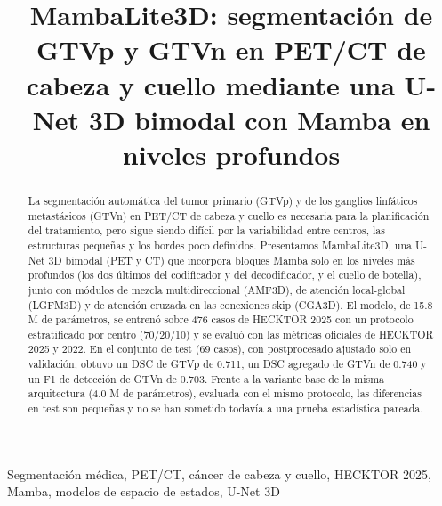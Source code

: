\documentclass[conference]{IEEEtran}
\begin{document}
\title{MambaLite3D: segmentación de GTVp y GTVn en PET/CT de cabeza y cuello mediante una U-Net 3D bimodal con Mamba en niveles profundos}

\author{
    \and

}

\maketitle
\begin{abstract}
La segmentación automática del tumor primario (GTVp) y de los ganglios linfáticos metastásicos (GTVn) en PET/CT de cabeza y cuello es necesaria para la planificación del tratamiento, pero sigue siendo difícil por la variabilidad entre centros, las estructuras pequeñas y los bordes poco definidos. Presentamos MambaLite3D, una U-Net 3D bimodal (PET y CT) que incorpora bloques Mamba solo en los niveles más profundos (los dos últimos del codificador y del decodificador, y el cuello de botella), junto con módulos de mezcla multidireccional (AMF3D), de atención local-global (LGFM3D) y de atención cruzada en las conexiones skip (CGA3D). El modelo, de 15.8 M de parámetros, se entrenó sobre 476 casos de HECKTOR 2025 con un protocolo estratificado por centro (70/20/10) y se evaluó con las métricas oficiales de HECKTOR 2025 y 2022. En el conjunto de test (69 casos), con postprocesado ajustado solo en validación, obtuvo un DSC de GTVp de 0.711, un DSC agregado de GTVn de 0.740 y un F1 de detección de GTVn de 0.703. Frente a la variante base de la misma arquitectura (4.0 M de parámetros), evaluada con el mismo protocolo, las diferencias en test son pequeñas y no se han sometido todavía a una prueba estadística pareada.
\end{abstract}

\renewcommand{\IEEEkeywordsname}{Palabras clave}
\begin{IEEEkeywords}
Segmentación médica, PET/CT, cáncer de cabeza y cuello, HECKTOR 2025, Mamba, modelos de espacio de estados, U-Net 3D
\end{IEEEkeywords}
\end{document}
